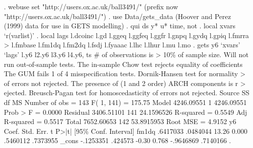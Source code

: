 . webuse set "http://users.ox.ac.uk/{\tytilde}ball3491/"
(prefix now "http://users.ox.ac.uk/{\tytilde}ball3491/")
{\smallskip}
. use Data/gets_data
(Hoover and Perez (1999) data for use in GETS modelling)
{\smallskip}
. qui ds y* u* time, not
{\smallskip}
. local xvars `r(varlist)' 
{\smallskip}
. local lags l.dcoinc l.gd l.ggeq l.ggfeq l.ggfr l.gnpq l.gydq l.gpiq l.fmrra
> l.fmbase l.fm1dq l.fm2dq l.fsdj l.fyaaac l.lhc l.lhur l.mu l.mo 
{\smallskip}
. gets y6 `xvars' `lags' l.y6 l2.y6 l3.y6 l4.y6, ts
\# of observations is > 10\% of sample size.  Will not run out-of-sample tests.
The in-sample Chow test rejects equality of coefficients
{\smallskip}
The GUM fails 1 of 4 misspecification tests.  Dornik-Hansen test for normality 
> of errors not rejected.  The presence of (1 and 2 order) ARCH components is r
> ejected. Breusch-Pagan test for homoscedasticity of errors not rejected.
{\smallskip}
{\smallskip}
      Source {\VBAR}       SS       df       MS              Number of obs =     143
           F(  1,   141) =  175.75
       Model {\VBAR}  4246.09551     1  4246.09551           Prob > F      =  0.0000
    Residual {\VBAR}  3406.51101   141  24.1596526           R-squared     =  0.5549
           Adj R-squared =  0.5517
       Total {\VBAR}  7652.60653   142  53.8915953           Root MSE      =  4.9152
{\smallskip}
          y6 {\VBAR}      Coef.   Std. Err.      t    P>|t|     [95\% Conf. Interval]
       fm1dq {\VBAR}   .6417033   .0484044    13.26   0.000     .5460112    .7373955
       _cons {\VBAR}  -.1253351    .424573    -0.30   0.768    -.9646869    .7140166
{\smallskip}
.  
